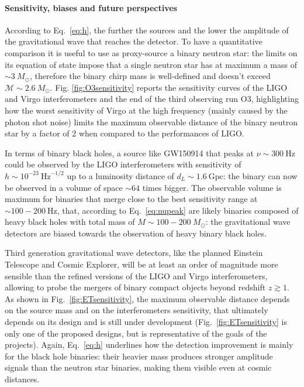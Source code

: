\documentclass[a4paper,titlepage]{book}     	%
\newcommand{\sun}{\ensuremath{_\odot}}
\newcommand{\msun}{\ensuremath{M\sun}}
\begin{document}
\paragraph{Sensitivity, biases and future perspectives}
According to Eq.\ \ref{eq:h}, the further the sources and the lower the amplitude of the gravitational wave that reaches the detector.  To have a quantitative comparison it is useful to use as proxy-source a binary neutron star: the limits on its equation of state impose that a single neutron star has at maximum a mass of $\sim 3~\msun$, therefore the binary chirp mass is well-defined and doesn't exceed $\mathcal{M} \sim 2.6 ~\msun$. \cite{NSreview} Fig. \ref{fig:O3sensitivity} reports the sensitivity curves of the LIGO and Virgo interferometers and the end of the third observing run O3, highlighting how the worst sensitivity of Virgo at the high frequency (mainly caused by the photon shot noise) limits the maximum observable distance of the binary neutron star by a factor of 2 when compared to the performances of LIGO. \cite{GWTC-3} 

In terms of binary black holes, a source like GW150914 that peaks at $\nu \sim 300~\text{Hz}$ could be observed by the LIGO interferometers with sensitivity of $h \sim 10^{-23}~ \text{Hz}^{-1/2}$ up to a luminosity distance of $d_L \sim 1.6~\text{Gpc}$: the binary can now be observed in a volume of space $\sim 64$ times bigger. The observable volume is maximum for binaries that merge close to the best sensitivity range at $\sim 100-200~\text{Hz}$, that, according to Eq.\ \ref{eq:nupeak} are likely binaries composed of heavy black holes with total mass of $M \sim 100-200~\msun$: the gravitational wave detectors are biased towards the observation of heavy binary black holes.


Third generation gravitational wave detectors, like the planned Einstein Telescope and Cosmic Explorer, will be at least an order of magnitude more sensible than the refined versions of the LIGO and Virgo interferometers, allowing to probe the mergers of binary compact objects beyond redshift $z \gtrsim 1$. As shown in Fig.\ \ref{fig:ETsensitivity}, the maximum observable distance depends on the source mass and on the interferometers sensitivity, that ultimately depends on its design and is still under development (Fig.\ \ref{fig:ETsensitivity} is only one of the proposed designs, but is representative of the goals of the projects). \cite{EThorizonsensitivity} Again, Eq.\ \ref{eq:h} underlines how the detection improvement is mainly for the black hole binaries: their heavier mass produces stronger amplitude signals than the neutron star binaries, making them visible even at cosmic distances.
\end{document}
